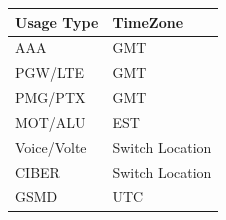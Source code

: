 \documentclass[12pt,twoside]{article}
\begin{document}
\begin{center}
\begin{tabular}{ll}
\hline
 \textbf{Usage Type}  &  \textbf{TimeZone}  \\
\hline
 AAA                  &  GMT                \\
 PGW/LTE              &  GMT                \\
 PMG/PTX              &  GMT                \\
 MOT/ALU              &  EST                \\
 Voice/Volte          &  Switch Location    \\
 CIBER                &  Switch Location    \\
 GSMD                 &  UTC                \\
\hline
\end{tabular}
\end{center}
\end{document}
